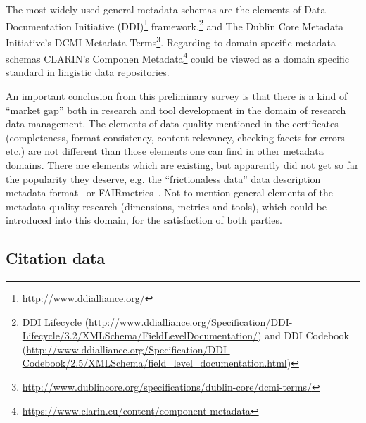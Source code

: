 The most widely used general metadata schemas are the elements of Data Documentation Initiative (DDI)\footnote{\url{http://www.ddialliance.org/}} framework,\footnote{DDI Lifecycle (\url{http://www.ddialliance.org/Specification/DDI-Lifecycle/3.2/XMLSchema/FieldLevelDocumentation/}) and DDI Codebook (\url{http://www.ddialliance.org/Specification/DDI-Codebook/2.5/XMLSchema/field_level_documentation.html})} and The Dublin Core Metadata Initiative's DCMI Metadata Terms\footnote{\url{http://www.dublincore.org/specifications/dublin-core/dcmi-terms/}}. Regarding to domain specific metadata schemas CLARIN's Componen Metadata\footnote{\url{https://www.clarin.eu/content/component-metadata}} could be viewed as a domain specific standard in lingistic data repositories.

An important conclusion from this preliminary survey is that there is a kind of ``market gap'' both in research and tool development in the domain of research data management. The elements of data quality mentioned in the certificates (completeness, format consistency, content relevancy, checking facets for errors etc.) are not different than those elements one can find in other metadata domains. There are elements which are existing, but apparently did not get so far the popularity they deserve, e.g. the ``frictionaless data'' data description metadata format~\cite{fowler2018} or FAIRmetrics~\cite{fairmetrics}. Not to mention general elements of the metadata quality research (dimensions, metrics and tools), which could be introduced into this domain, for the satisfaction of both parties.

\subsection{Citation data}

